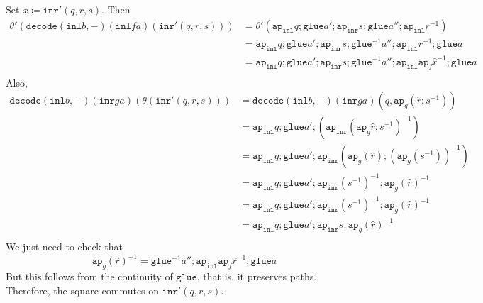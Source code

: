 \documentclass[12pt]{amsart}
\newcommand{\inv}{^{-1}}
\newcommand{\type}[1]{\mathtt{#1}}
\newcommand{\ap}{\type{ap}}
\newcommand{\inl}{\type{inl}}
\newcommand{\inr}{\type{inr}}
\newcommand{\glue}{\type{glue}}
\newcommand{\decode}{\type{decode}}
\theoremstyle{remark}
\theoremstyle{definition}
\begin{document}
Set \( x \coloneqq \inr' ( q,r,s ) \). Then
\begin{align*}
  \theta' ( \decode (\inl b,-) ( \inl fa ) ( \inr' ( q,r,s ) ) )
  & = \theta' ( \ap_{\inl} q ; \glue a' ; \ap_{\inr} s ; \glue a'' ;
    \ap_{\inl} r^{-1} ) \\
  & =  \ap_{\inl} q ; \glue a' ; \ap_{\inr} s ; \glue^{-1} a'' ;
    \ap_{\inl} r^{-1} ; \glue a \\
   & =  \ap_{\inl} q ; \glue a' ; \ap_{\inr} s ; \glue^{-1} a'' ;
    \ap_{\inl} \ap_f \hat{r}^{-1} ; \glue a \\
\end{align*}
Also,
\begin{align*}
  \decode ( \inl b , - ) ( \inr ga ) ( \theta ( \inr' ( q,r,s ) ) )
  & = \decode ( \inl b , - )( \inr ga )( q , \ap_g ( \hat{r} ; s^{-1}
    ) ) \\
  & = \ap_{\inl} q ; \glue a' ; ( \ap_{\inr} ( \ap_g \hat{r} ; s^{-1} )^{-1} ) \\
  & = \ap_{\inl} q ; \glue a' ; \ap_{\inr} ( \ap_g ( \hat{r} ) ; ( \ap_g
    (s^{-1}) )^{-1} ) \\
  & = \ap_{\inl} q ; \glue a' ; \ap_{\inr} (s^{-1})^{-1} ;  \ap_g ( \hat{r} )^{-1} \\
  & = \ap_{\inl} q ; \glue a' ; \ap_{\inr} (s^{-1})^{-1} ;  \ap_g ( \hat{r} )^{-1} \\
  & = \ap_{\inl} q ; \glue a' ; \ap_{\inr} s ;  \ap_g ( \hat{r} )^{-1} \\
\end{align*}
We just need to check that
\[
  \ap_g ( \hat{r} )\inv = \glue\inv a'' ; \ap_{ \inl } \ap_f
  \hat{r}\inv ; \glue a
\]
But this follows from the continuity of \( \glue \), that is, it
preserves paths. Therefore, the square commutes on \( \inr' ( q,r,s )
\).
\end{document}
